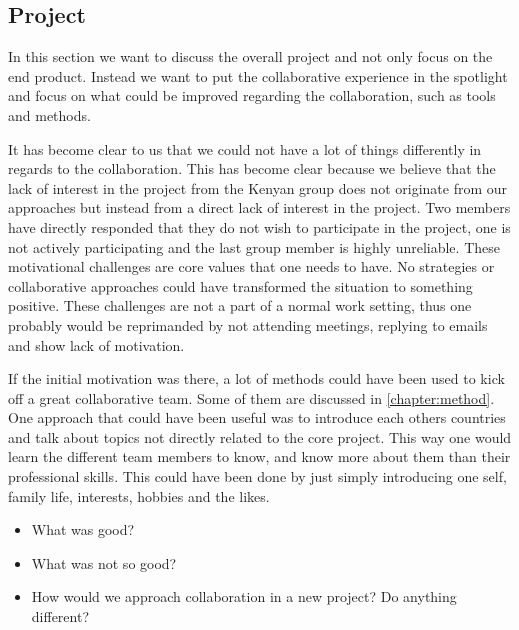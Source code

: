 \subsection{Project}\label{subsec:project}
In this section we want to discuss the overall project and not only focus on the end product. Instead we want to put the collaborative experience in the spotlight and focus on what could be improved regarding the collaboration, such as tools and methods. 

It has become clear to us that we could not have a lot of things differently in regards to the collaboration. This has become clear because we believe that the lack of interest in the project from the Kenyan group does not originate from our approaches but instead from a direct lack of interest in the project. Two members have directly responded that they do not wish to participate in the project, one is not actively participating and the last group member is highly unreliable. These motivational challenges are core values that one needs to have. No strategies or collaborative approaches could have transformed the situation to something positive. These challenges are not a part of a normal work setting, thus one probably would be reprimanded by not attending meetings, replying to emails and show lack of motivation.

If the initial motivation was there, a lot of methods could have been used to kick off a great collaborative team. Some of them are discussed in \ref{chapter:method}. One approach that could have been useful was to introduce each others countries and talk about topics not directly related to the core project. This way one would learn the different team members to know, and know more about them than their professional skills. This could have been done by just simply introducing one self, family life, interests, hobbies and the likes.



\begin{itemize}
	\item What was good?
	\item What was not so good?
	\item How would we approach collaboration in a new project? Do anything different?
\end{itemize}





